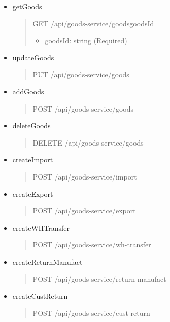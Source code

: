 \begin{itemize}
	\item getGoods
	      \begin{quote}
		      GET /api/goods-service/goods{goodsId}
		      \begin{itemize}
			      \item goodsId: string (Required)
		      \end{itemize}
	      \end{quote}

	\item updateGoods
	      \begin{quote}
		      PUT /api/goods-service/goods
	      \end{quote}

	\item addGoods
	      \begin{quote}
		      POST /api/goods-service/goods
	      \end{quote}

	\item deleteGoods
	      \begin{quote}
		      DELETE /api/goods-service/goods
	      \end{quote}

	\item createImport
	      \begin{quote}
		      POST /api/goods-service/import
	      \end{quote}

	\item createExport
	      \begin{quote}
		      POST /api/goods-service/export
	      \end{quote}

	\item createWHTransfer
	      \begin{quote}
		      POST /api/goods-service/wh-transfer
	      \end{quote}

	\item createReturnManufact
	      \begin{quote}
		      POST /api/goods-service/return-manufact
	      \end{quote}

	\item createCustReturn
	      \begin{quote}
		      POST /api/goods-service/cust-return
	      \end{quote}
\end{itemize}

